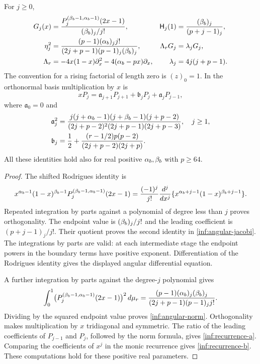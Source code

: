 \begin{lemma}\label{inf:angular-formulas}
For $j\ge0$,
\begin{align}
 G_j(x)&=\frac{P_j^{(\beta_b-1,\alpha_b-1)}(2x-1)}{(\beta_b)_j/j!},
 &\mathsf H_j(1)&=\frac{(\beta_b)_j}{(p+j-1)_j},\label{inf:angular-jacobi}\\
 \eta_j^2&=\frac{(p-1)(\alpha_b)_j j!}
 {(2j+p-1)(p-1)_j(\beta_b)_j},
 &\Lambda_rG_j&=\lambda_jG_j,\label{inf:angular-norm}\\
 \Lambda_r&=-4x(1-x)\partial_x^2-4(\alpha_b-px)\partial_x,
 &\lambda_j&=4j(j+p-1).\nonumber
\end{align}
The convention for a rising factorial of length zero is $(z)_0=1$.
In the orthonormal basis multiplication by $x$ is
\begin{equation}\label{inf:jacobi-matrix}
 xP_j=\mathfrak a_{j+1}P_{j+1}+\mathfrak b_jP_j
       +\mathfrak a_jP_{j-1},
\end{equation}
where $\mathfrak a_0=0$ and
\begin{align}
 \mathfrak a_j^2&=
 \frac{j(j+\alpha_b-1)(j+\beta_b-1)(j+p-2)}
 {(2j+p-2)^2(2j+p-1)(2j+p-3)},\quad j\ge1,
 \label{inf:recurrence-a}\\
 \mathfrak b_j&=\frac12+
 \frac{(r-1/2)p(p-2)}{(2j+p-2)(2j+p)}.
 \label{inf:recurrence-b}
\end{align}
All these identities hold also for real positive $\alpha_b,\beta_b$ with $p\ge64$.
\end{lemma}
\begin{proof}
The shifted Rodrigues identity is
\[
 x^{\alpha_b-1}(1-x)^{\beta_b-1}P_j^{(\beta_b-1,\alpha_b-1)}(2x-1)
 =\frac{(-1)^j}{j!}\frac{d^j}{dx^j}
       \{x^{\alpha_b+j-1}(1-x)^{\beta_b+j-1}\}.
\]
Repeated integration by parts against a polynomial of degree less than
$j$ proves orthogonality. The endpoint value is $(\beta_b)_j/j!$ and the
leading coefficient is $(p+j-1)_j/j!$. Their quotient proves the
second identity in \eqref{inf:angular-jacobi}. The integrations by parts
are valid: at each intermediate stage the endpoint powers in the
boundary terms have positive exponent. Differentiation of the Rodrigues
identity gives the displayed angular differential equation.

A further integration by parts against the degree-$j$ polynomial gives
\[
 \int_0^1\bigl(P_j^{(\beta_b-1,\alpha_b-1)}(2x-1)\bigr)^2\,d\mu_r
 =\frac{(p-1)(\alpha_b)_j(\beta_b)_j}
        {(2j+p-1)(p-1)_j j!}.
\]
Dividing by the squared endpoint value proves
\eqref{inf:angular-norm}. Orthogonality makes multiplication by $x$
tridiagonal and symmetric. The ratio of the leading coefficients of
$P_{j-1}$ and $P_j$, followed by the norm formula, gives
\eqref{inf:recurrence-a}. Comparing the coefficients of $x^j$ in the
monic recurrence gives \eqref{inf:recurrence-b}. These computations
hold for these positive real parameters.
\end{proof}

